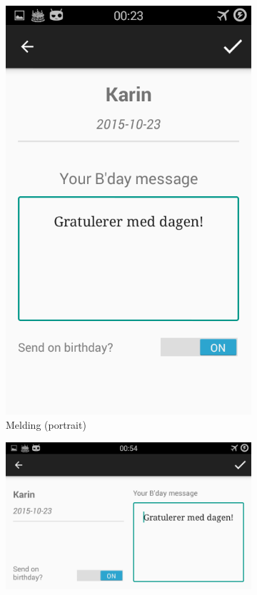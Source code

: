 \begin{figure}[ht]
    \centering
    \begin{subfigure}[b]{0.35\textwidth}
        \includegraphics[width=\textwidth]{./img/3.png}
        \caption{Melding (portrait)}
        \label{fig:melding_p}
    \end{subfigure}
    \begin{subfigure}[b]{0.6\textwidth}
        \includegraphics[width=\textwidth]{./img/14.png}

\end{subfigure}
\end{figure}
